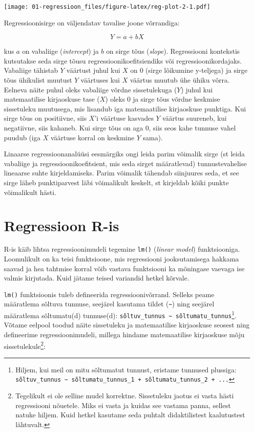 \documentclass[
]{book}
\begin{document}
\texttt{[image: 01-regressioon\_files/figure-latex/reg-plot-2-1.pdf]}

Regressioonisirge on väljendatav tavalise joone võrrandiga:

\begin{equation}
Y=a+bX
\end{equation}

kus \(a\) on vabaliige (\emph{intercept}) ja \(b\) on sirge tõus (\emph{slope}). Regressiooni kontekstis kutsutakse seda sirge tõusu regressioonikoefitsiendiks või regressioonikordajaks. Vabaliige tähistab \(Y\) väärtust juhul kui \(X\) on \(0\) (sirge lõikumine y-teljega) ja sirge tõus ühikulist muutust \(Y\) väärtuses kui \(X\) väärtus muutub ühe ühiku võrra. Eelneva näite puhul oleks vabaliige võrdne sissetulekuga (\(Y\)) juhul kui matemaatilise kirjaoskuse tase (\(X\)) oleks \(0\) ja sirge tõus võrdne keskmise sissetuleku muutusega, mis lisandub iga matemaatilise kirjaoskuse punktiga. Kui sirge tõus on positiivne, siis \(X\)'i väärtuse kasvades \(Y\) väärtus suureneb, kui negatiivne, siis kahaneb. Kui sirge tõus on aga \(0\), siis seos kahe tunnuse vahel puudub (iga \(X\) väärtuse korral on keskmine \(Y\) sama).

Linaarse regressioonanalüüsi eesmärgiks ongi leida parim võimalik sirge (st leida vabaliige ja regressioonikoefitsient, mis seda sirget määratlevad) tunnustevahelise lineaarse suhte kirjeldamiseks. Parim võimalik tähendab siinjuures seda, et see sirge läheb punktiparvest läbi võimalikult keskelt, st kirjeldab kõiki punkte võimalikult hästi.

\hypertarget{regressioon-r-is}{%
\section{Regressioon R-is}\label{regressioon-r-is}}

R-is käib lihtsa regressioonimudeli tegemine \texttt{lm()} (\emph{linear model}) funktsiooniga. Loomulikult on ka teisi funktsioone, mis regressiooni jooksutamisega hakkama saavad ja hea tahtmise korral võib vastava funktsiooni ka mõningase vaevaga ise valmis kirjutada. Kuid jätame teised variandid hetkel kõrvale.

\texttt{lm()} funktsioonis tuleb defineerida regressioonivõrrand. Selleks peame määratlema sõltuva tunnuse, seejärel kasutama tildet (\texttt{\textasciitilde{}}) ning seejärel määratlema sõltumatu(d) tunnuse(d): \texttt{sõltuv\_tunnus\ \textasciitilde{}\ sõltumatu\_tunnus}\footnote{Hiljem, kui meil on mitu sõltumatut tunnust, eristame tunnused plussiga: \texttt{sõltuv\_tunnus\ \textasciitilde{}\ sõltumatu\_tunnus\_1\ +\ sõltumatu\_tunnus\_2\ +\ ...}}. Võtame eelpool toodud näite sissetuleku ja matemaatilise kirjaoskuse seosest ning defineerime regressioonimudeli, millega hindame matemaatilise kirjaoskuse mõju sissetulekule\footnote{Tegelikult ei ole selline mudel korrektne. Sissetuleku jaotus ei vasta hästi regressiooni nõuetele. Miks ei vasta ja kuidas see vastama panna, sellest natuke hiljem. Kuid hetkel kasutame seda puhtalt didaktilistest kaalutustest lähtuvalt.}:
\end{document}
